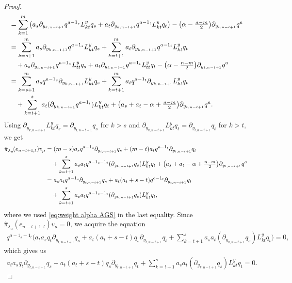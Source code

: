 \begin{proof}
\begin{align*}
  &= \sum_{k=1}^m \big(a_s\partial_{y_{k,n-t+1}}q^{a-1_s} L^y_{kt}q_s + a_t\partial_{y_{k,n-t+1}}q^{a-1_t} L^y_{kt}q_t \big)- \big(\alpha - {\textstyle {n-m \over 2}} \big)\partial_{y_{t,n-t+1}}q^a \\
  & =\sum_{k=s+1}^m a_s\partial_{y_{k,n-t+1}}q^{a-1_s} L^y_{kt}q_s +\sum_{k=t+1}^m  a_t\partial_{y_{k,n-t+1}}q^{a-1_t} L^y_{kt}q_t \\
  & \quad +a_s\partial_{y_{t,n-t+1}}q^{a-1_s} L^y_{tt}q_s + a_t\partial_{y_{t,n-t+1}}q^{a-1_t} L^y_{tt}q_t - \big(\alpha - {\textstyle {n-m \over 2}} \big)\partial_{y_{t,n-t+1}}q^a \\
  &= \sum_{k=s+1}^m a_sq^{a-1_s} \partial_{y_{k,n-t+1}}L^y_{kt}q_s +\sum_{k=t+1}^m  a_tq^{a-1_t} \partial_{y_{k,n-t+1}}L^y_{kt}q_t \\
  & \quad + \sum_{k=t+1}^s a_t (\partial_{y_{k,n-t+1}}q^{a-1_t}) L^y_{kt}q_t +\big(a_s+a_t-\alpha+{\textstyle {n-m\over 2}}\big) \partial_{y_{t,n-t+1}}q^a.
\end{align*}
Using $\partial_{y_{k,n-t+1}}L^y_{kt}q_s=\partial_{y_{t,n-t+1}}q_s$ for $k>s$ and $\partial_{y_{k,n-t+1}}L^y_{kt}q_t=\partial_{y_{t,n-t+1}}q_t$ for $k>t$, we get
\begin{align*}
  \hat{\pi}_{\lambda_\alpha}\!(e_{n-t+1,t})v_\mu&= (m-s) a_sq^{a-1_s} \partial_{y_{t,n-t+1}}q_s +(m-t) a_tq^{a-1_t} \partial_{y_{t,n-t+1}}q_t \\
  & \quad + \sum_{k=t+1}^s a_s a_t q^{a-1_s-1_t}(\partial_{y_{k,n-t+1}}q_s) L^y_{kt}q_t +\big(a_s+a_t-\alpha+{\textstyle {n-m\over 2}}\big) \partial_{y_{t,n-t+1}}q^a  \\
  & = a_sa_t q^{a-1_s} \partial_{y_{t,n-t+1}} q_s +a_t(a_t+s-t) q^{a-1_t} \partial_{y_{t,n-t+1}} q_t \\
  & \quad + \sum_{k=t+1}^s a_s a_t q^{a-1_s-1_t}(\partial_{y_{k,n-t+1}}q_s) L^y_{kt}q_t,
\end{align*}
where we used \eqref{eq:weight alpha AGS} in the last equality. Since $\hat{\pi}_{\lambda_\alpha}\!(e_{n-t+1,t})v_\mu=0$, we acquire the equation
\begin{align*}
q^{a-1_s-1_t}\!\bigg(a_ta_s q_t \partial_{y_{t,n-t+1}} q_s + a_t(a_t+s-t)q_s \partial_{y_{t,n-t+1}} q_t + \sum_{k=t+1}^s a_sa_t (\partial_{y_{k,n-t+1}}q_s) L^y_{kt}q_t\!\bigg) = 0,
\end{align*}
which gives us
\begin{align*}
  a_ta_s q_t \partial_{y_{t,n-t+1}} q_s + a_t(a_t+s-t)q_s \partial_{y_{t,n-t+1}} q_t + \sum_{k=t+1}^s a_sa_t (\partial_{y_{k,n-t+1}}q_s) L^y_{kt}q_t = 0.
\end{align*}

\end{proof}
